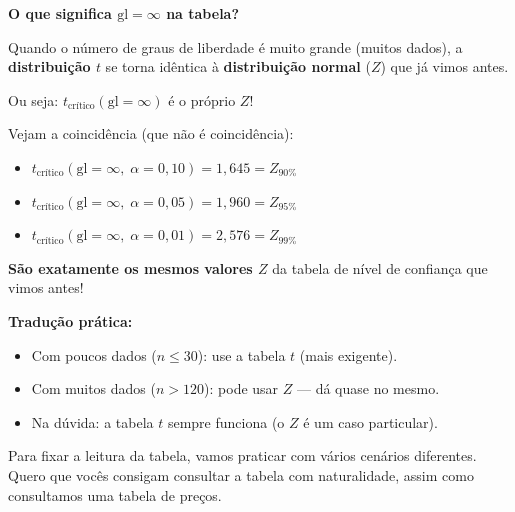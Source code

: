 \begin{SolvedBox}
\textbf{O que significa $\text{gl} = \infty$ na tabela?}

Quando o número de graus de liberdade é muito grande (muitos dados),
a \textbf{distribuição $t$} se torna idêntica à \textbf{distribuição
normal} ($Z$) que já vimos antes.

Ou seja: $t_{\text{crítico}}(\text{gl} = \infty)$ é o próprio $Z$!

Vejam a coincidência (que não é coincidência):
\begin{itemize}
  \item $t_{\text{crítico}}(\text{gl} = \infty,\; \alpha = 0{,}10) = 1{,}645 = Z_{90\%}$
  \item $t_{\text{crítico}}(\text{gl} = \infty,\; \alpha = 0{,}05) = 1{,}960 = Z_{95\%}$
  \item $t_{\text{crítico}}(\text{gl} = \infty,\; \alpha = 0{,}01) = 2{,}576 = Z_{99\%}$
\end{itemize}

\textbf{São exatamente os mesmos valores $Z$} da tabela de nível de
confiança que vimos antes!

\textbf{Tradução prática:}
\begin{itemize}
  \item Com poucos dados ($n \leq 30$): use a tabela $t$ (mais exigente).
  \item Com muitos dados ($n > 120$): pode usar $Z$ — dá quase no mesmo.
  \item Na dúvida: a tabela $t$ sempre funciona (o $Z$ é um caso particular).
\end{itemize}
\end{SolvedBox}

Para fixar a leitura da tabela, vamos praticar com vários cenários
diferentes. Quero que vocês consigam consultar a tabela com naturalidade,
assim como consultamos uma tabela de preços.

